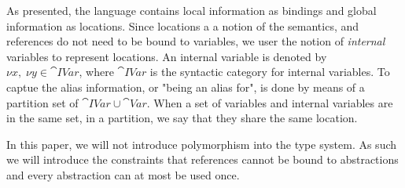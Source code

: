 \documentclass{llncs}
\begin{document}
As presented, the language contains local information as bindings and global information as locations.
Since locations a a notion of the semantics, and references do not need to be bound to variables, we user the notion of \emph{internal} variables to represent locations.
An internal variable is denoted by $\nu x,\; \nu y\in\cat{IVar}$, where $\cat{IVar}$ is the syntactic category for internal variables.
To captue the alias information, or "being an alias for", is done by means of a partition set of $\cat{IVar} \cup \cat{Var}$.
When a set of variables and internal variables are in the same set, in a partition, we say that they share the same location.





In this paper, we will not introduce polymorphism into the type
system.  As such we will introduce the constraints that references
cannot be bound to abstractions and every abstraction can at most be
used once.
\end{document}
